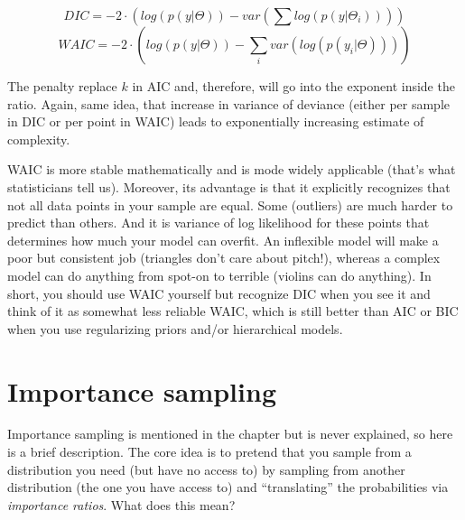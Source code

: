 \documentclass[
]{book}
\begin{document}
\[DIC = -2 \cdot \left( log(p(y|\Theta)) - var(\sum log(p(y|\Theta_i))) \right)\]
\[WAIC = -2 \cdot \left( log(p(y|\Theta)) - \sum_i var(log(p(y_i|\Theta))) \right)\]

The penalty replace \(k\) in AIC and, therefore, will go into the exponent inside the ratio. Again, same idea, that increase in variance of deviance (either per sample in DIC or per point in WAIC) leads to exponentially increasing estimate of complexity.

WAIC is more stable mathematically and is mode widely applicable (that's what statisticians tell us). Moreover, its advantage is that it explicitly recognizes that not all data points in your sample are equal. Some (outliers) are much harder to predict than others. And it is variance of log likelihood for these points that determines how much your model can overfit. An inflexible model will make a poor but consistent job (triangles don't care about pitch!), whereas a complex model can do anything from spot-on to terrible (violins can do anything). In short, you should use WAIC yourself but recognize DIC when you see it and think of it as somewhat less reliable WAIC, which is still better than AIC or BIC when you use regularizing priors and/or hierarchical models.

\hypertarget{importance-sampling}{%
\section{Importance sampling}\label{importance-sampling}}

Importance sampling is mentioned in the chapter but is never explained, so here is a brief description. The core idea is to pretend that you sample from a distribution you need (but have no access to) by sampling from another distribution (the one you have access to) and ``translating'' the probabilities via \emph{importance ratios}. What does this mean?
\end{document}
